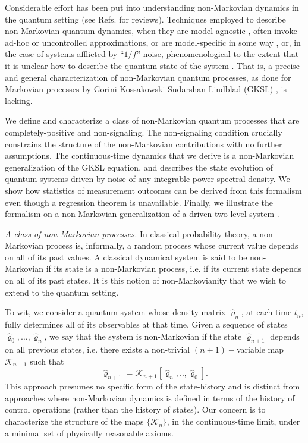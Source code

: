 \documentclass[
    11pt,
    letterpaper,
    reprint,
    notitlepage,
    superscriptaddress,
    aps,prx
]{revtex4-2}
\renewcommand{\rho}{\varrho}
\newcommand{\K}{\mathcal{K}}
\begin{document}
Considerable effort has been put into understanding non-Markovian dynamics in the quantum setting (see Refs. \cite{RivPlen14,BreuVacc16,RevModPhys.89.015001,LiWise18,Chru22} for reviews). 
Techniques employed to describe non-Markovian quantum dynamics, when they are 
model-agnostic \cite{Nakajima,Zwanzig,Mori65,ShibHash79,Grahm89,Breuer2007,ChruKoss10,GioPalm12,
Polloc2018,White2025}, often invoke ad-hoc or uncontrolled approximations, or are model-specific in 
some way \cite{HuPazZha92,Bud04,Shabani2005,BreuVac08,Ciccarello2013,Vacchini2013,Vacch16,Lorenzo2016},
or, in the case of systems afflicted by ``$1/f$'' noise, phenomenological to the extent that it 
is unclear how to describe the quantum state of the system \cite{PalAlt14,BrowBla15,Saul90}.
That is, a precise and general characterization of non-Markovian quantum processes, as done
for Markovian processes by Gorini-Kossakowski-Sudarshan-Lindblad (GKSL) \cite{GKS76,Lind76}, 
is lacking.

We define and characterize a class of non-Markovian quantum processes that are 
completely-positive and non-signaling.
The non-signaling condition crucially constrains the structure of the non-Markovian contributions
with no further assumptions.
The continuous-time dynamics that we derive is a non-Markovian generalization of 
the GKSL equation,
and describes the state evolution of quantum systems driven by 
noise of any integrable power spectral density.
We show how statistics of measurement outcomes can be derived from this formalism even though
a regression theorem is unavailable.
Finally, we illustrate the formalism on a non-Markovian generalization 
of a driven two-level system \cite{Mollow1969}.


\emph{A class of non-Markovian processes.}
In classical probability theory, a non-Markovian process is, informally, a random process whose
current value depends on all of its past values. A classical dynamical system is said to be
non-Markovian if its state is a non-Markovian process, i.e. if its current state depends on all of its
past states. It is this notion of non-Markovianity that we wish to extend to the quantum setting.

To wit, we consider a quantum system whose density matrix $\hat \rho_n$, at each time $t_n$, fully determines all of its observables at that time. Given a sequence of states $\hat{\rho}_0,\ldots, 
\hat{\rho}_n$, we say that the system is non-Markovian if the state $\hat{\rho}_{n+1}$ depends on all
previous states, i.e. there exists a non-trivial $(n+1)-$variable map $\K_{n+1}$ such that 
\begin{equation}\label{eq:Kn}
	\hat \rho_{n+1} = \K_{n+1}[\hat \rho_n, .., \hat \rho_0].
\end{equation}
This approach presumes no specific form of the state-history and 
is distinct from approaches where non-Markovian dynamics is defined in terms of the history 
of control operations \cite{MilMod21} (rather than the history of states).
Our concern is to characterize the structure of the maps $\{\K_n\}$, 
in the continuous-time limit, under a minimal set of physically reasonable axioms.
\end{document}
